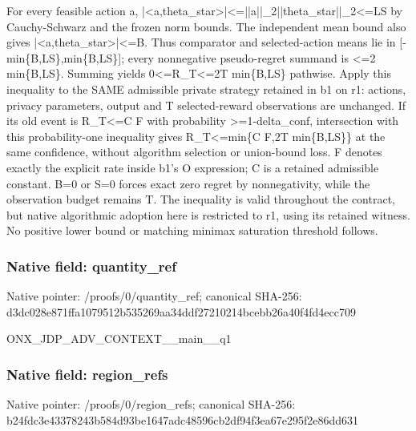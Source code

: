 \documentclass[10pt,a4paper]{article}
\begin{document}
\begingroup\raggedright\sloppy For every feasible action a,\allowbreak{} |<a,\allowbreak{}theta\_\allowbreak{}star>|<=\allowbreak{}||a||\_\allowbreak{}2||theta\_\allowbreak{}star||\_\allowbreak{}2<=\allowbreak{}LS by Cauchy-Schwarz and the frozen norm bounds. The independent mean bound also gives |<a,\allowbreak{}theta\_\allowbreak{}star>|<=\allowbreak{}B. Thus comparator and selected-action means lie in [-min\{B,\allowbreak{}LS\},\allowbreak{}min\{B,\allowbreak{}LS\}];\allowbreak{} every nonnegative pseudo-regret summand is <=\allowbreak{}2 min\{B,\allowbreak{}LS\}. Summing yields 0<=\allowbreak{}R\_\allowbreak{}T<=\allowbreak{}2T min\{B,\allowbreak{}LS\} pathwise. Apply this inequality to the SAME admissible private strategy retained in b1 on r1:\allowbreak{} actions,\allowbreak{} privacy parameters,\allowbreak{} output and T selected-reward observations are unchanged. If its old event is R\_\allowbreak{}T<=\allowbreak{}C F with probability >=\allowbreak{}1-delta\_\allowbreak{}conf,\allowbreak{} intersection with this probability-one inequality gives R\_\allowbreak{}T<=\allowbreak{}min\{C F,\allowbreak{}2T min\{B,\allowbreak{}LS\}\} at the same confidence,\allowbreak{} without algorithm selection or union-bound loss. F denotes exactly the explicit rate inside b1's O expression;\allowbreak{} C is a retained admissible constant. B=\allowbreak{}0 or S=\allowbreak{}0 forces exact zero regret by nonnegativity,\allowbreak{} while the observation budget remains T. The inequality is valid throughout the contract,\allowbreak{} but native algorithmic adoption here is restricted to r1,\allowbreak{} using its retained witness. No positive lower bound or matching minimax saturation threshold follows.\par\endgroup

\subsubsection{Native field: quantity\_\allowbreak{}ref}
Native pointer: /proofs/0/quantity\_\allowbreak{}ref; canonical SHA-256: d3dc028e871ffa1079512b535269aa34ddf27210214bcebb26a40f4fd4ecc709

\begingroup\raggedright\sloppy ONX\_\allowbreak{}JDP\_\allowbreak{}ADV\_\allowbreak{}CONTEXT\_\allowbreak{}\_\allowbreak{}main\_\allowbreak{}\_\allowbreak{}q1\par\endgroup

\subsubsection{Native field: region\_\allowbreak{}refs}
Native pointer: /proofs/0/region\_\allowbreak{}refs; canonical SHA-256: b24fdc3e43378243b584d93be1647adc48596cb2df94f3ea67e295f2e86dd631
\end{document}

